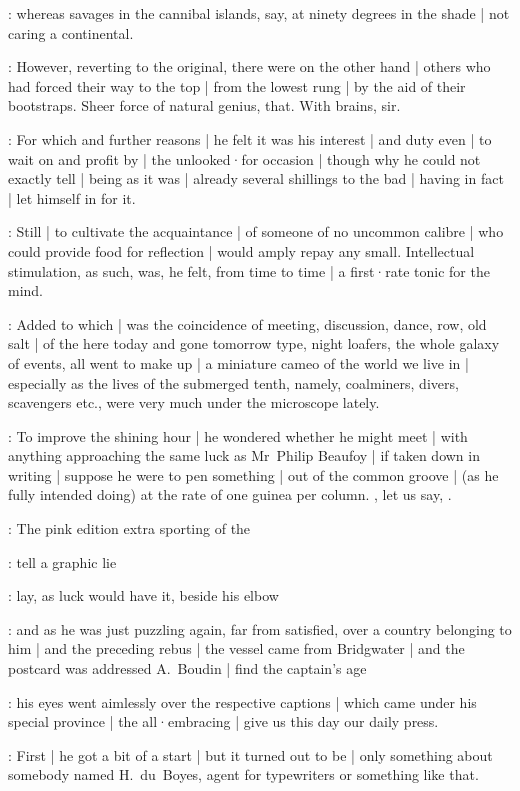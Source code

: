:
whereas savages in the cannibal islands,
say,
at ninety degrees in the shade |
not caring a continental.

:
However,
reverting to the original,
there were on the other hand |
others who had forced their way to the top |
from the lowest rung |
by the aid of their bootstraps.
Sheer force of natural genius,
that.
With brains,
sir.

:
For which and further reasons |
he felt it was his interest |
and duty even |
to wait on and profit by |
the unlooked·for occasion |
though why he could not exactly tell |
being as it was |
already several shillings to the bad |
having in fact |
let himself in for it.

:
Still |
to cultivate the acquaintance |
of someone of no uncommon calibre |
who could provide food for reflection |
would amply repay any small.
Intellectual stimulation,
as such,
was,
he felt,
from time to time |
a first·rate tonic for the mind.

:
Added to which |
was the coincidence of meeting,
discussion,
dance,
row,
old salt |
of the here today and gone tomorrow type,
night loafers,
the whole galaxy of events,
all went to make up |
a miniature cameo of the world we live in |
especially as the lives of the submerged tenth,
namely,
coalminers,
divers,
scavengers etc.,
were very much under the microscope lately.

:
To improve the shining hour |
he wondered whether he might meet |
with anything approaching the same luck as Mr~Philip Beaufoy |
if taken down in writing |
suppose he were to pen something |
out of the common groove |
(as he fully intended doing)
at the rate of one guinea per column.
,
let us say,
.

:
The pink edition extra sporting of the 

:
tell a graphic lie

:
lay,
as luck would have it,
beside his elbow

:
and as he was just puzzling again,
far from satisfied,
over a country belonging to him |
and the preceding rebus |
the vessel came from Bridgwater |
and the postcard was addressed A.~Boudin |
find the captain's age

:
his eyes went aimlessly over the respective captions |
which came under his special province |
the all·embracing |
give us this day our daily press.

:
First |
he got a bit of a start |
but it turned out to be |
only something about somebody named H.~du~Boyes,
agent for typewriters or something like that.%

